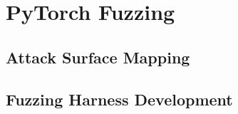 \section{PyTorch Fuzzing}
\subsection{Attack Surface Mapping}
\subsection{Fuzzing Harness Development}